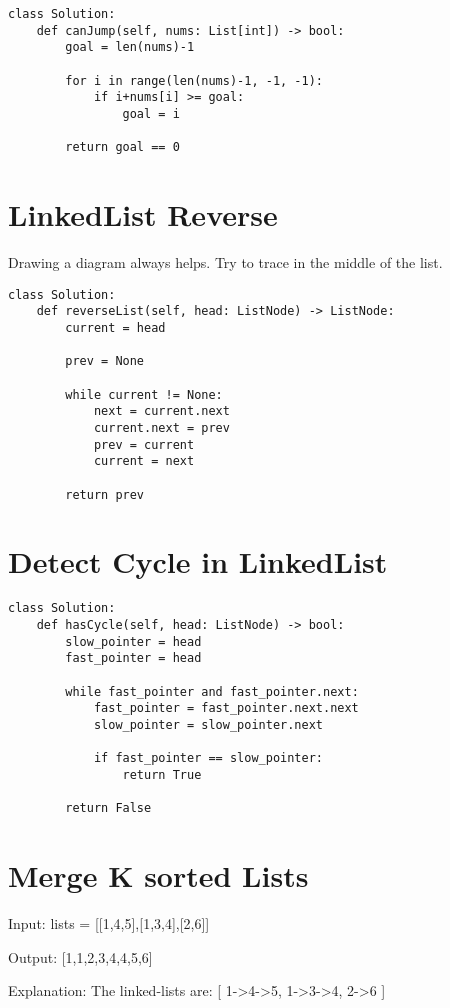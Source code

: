 \documentclass[24pt, a4]{article}
\begin{document}
\begin{lstlisting}
class Solution:
    def canJump(self, nums: List[int]) -> bool:
        goal = len(nums)-1
        
        for i in range(len(nums)-1, -1, -1):
            if i+nums[i] >= goal:
                goal = i
                
        return goal == 0
\end{lstlisting}

\section{LinkedList Reverse}
Drawing a diagram always helps. Try to trace in the middle of the list.
\begin{lstlisting}
class Solution:
    def reverseList(self, head: ListNode) -> ListNode:
        current = head
        
        prev = None
        
        while current != None:
            next = current.next
            current.next = prev
            prev = current
            current = next
            
        return prev
\end{lstlisting}

\section{Detect Cycle in LinkedList}

\begin{lstlisting}
class Solution:
    def hasCycle(self, head: ListNode) -> bool:
        slow_pointer = head
        fast_pointer = head
        
        while fast_pointer and fast_pointer.next:
            fast_pointer = fast_pointer.next.next
            slow_pointer = slow_pointer.next
            
            if fast_pointer == slow_pointer:
                return True
        
        return False
\end{lstlisting}

\section{Merge K sorted Lists}
Input: lists = [[1,4,5],[1,3,4],[2,6]]

Output: [1,1,2,3,4,4,5,6]

Explanation: The linked-lists are:
[
  1->4->5,
  1->3->4,
  2->6
]
\end{document}
